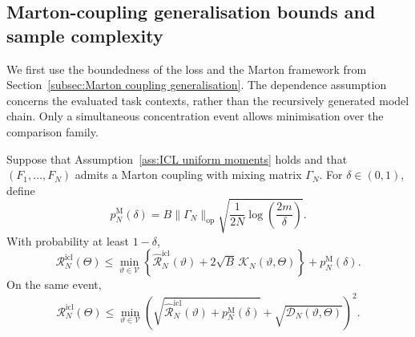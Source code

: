\subsection{Marton-coupling generalisation bounds and sample complexity}
\label{subsec:ICL Marton bounds}

We first use the boundedness of the loss and the Marton framework from Section~\ref{subsec:Marton coupling generalisation}. The dependence assumption concerns the evaluated task contexts, rather than the recursively generated model chain. Only a simultaneous concentration event allows minimisation over the comparison family.

\begin{theorem}
\label{thm:ICL Marton bound}
Suppose that Assumption~\ref{ass:ICL uniform moments} holds and that \((F_1,\ldots,F_N)\) admits a Marton coupling with mixing matrix \(\Gamma_N\). For \(\delta\in(0,1)\), define
\begin{equation}
\label{eq:ICL Marton penalty}
p_N^{\mathrm M}(\delta)
=B\|\Gamma_N\|_{\mathrm{op}}
\sqrt{\frac{1}{2N}\log\left(\frac{2m}{\delta}\right)}.
\end{equation}
With probability at least \(1-\delta\),
\begin{equation}
\label{eq:ICL Marton bound}
\mathcal R_N^{\mathrm{icl}}(\Theta)
\leqslant\min_{\vartheta\in\mathcal V}
\left\{\widehat{\mathcal R}_N^{\mathrm{icl}}(\vartheta)
+2\sqrt B\,\mathcal K_N(\vartheta,\Theta)\right\}
+p_N^{\mathrm M}(\delta).
\end{equation}
On the same event,
\begin{equation}
\label{eq:ICL root generalisation}
\mathcal R_N^{\mathrm{icl}}(\Theta)
\leqslant\min_{\vartheta\in\mathcal V}
\left(\sqrt{\widehat{\mathcal R}_N^{\mathrm{icl}}(\vartheta)+p_N^{\mathrm M}(\delta)}
+\sqrt{\mathcal D_N(\vartheta,\Theta)}\right)^2.
\end{equation}
\end{theorem}


